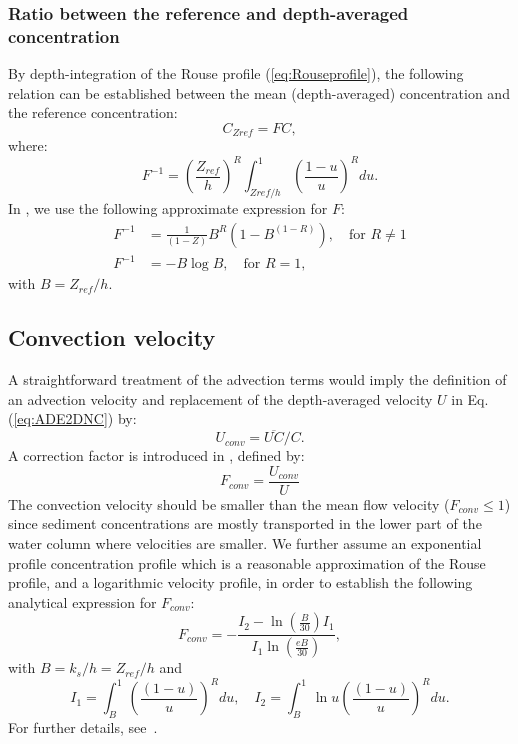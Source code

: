 \subsubsection{Ratio between the reference and depth-averaged concentration}
By depth-integration of the Rouse profile (\ref{eq:Rouseprofile}), the following relation
can be established between the mean (depth-averaged) concentration and the
reference concentration:
\begin{equation*}
C_{Zref} = F C,
\end{equation*}
where:
\begin{equation}\label{eq:Rouseprofile}
F^{-1} = \left(\frac{Z_{ref}}{h}\right)^R\int_{Zref/h}^1\left(\frac{1-u}{u}\right)^R du. 
\end{equation}
In \sisyphe, we use the following approximate expression for $F$:
\begin{align*}
F^{-1} &= \frac{1}{\left(1-Z\right)} B^R\left( 1-B^{(1-R)} \right), \quad \text{for } R \neq 1\\
F^{-1} &= -B \log B, \quad \text{for } R = 1,
\end{align*}
with $B = Z_{ref}/h$.

\subsection{Convection velocity}
A straightforward treatment of the advection terms would imply the
definition of an advection velocity and replacement of the depth-averaged
velocity $U$ in Eq. (\ref{eq:ADE2DNC}) by:
\begin{equation*}
U_{conv} = \overline{UC}/C.
\end{equation*}
A correction factor is introduced in \sisyphe, defined by:
\begin{equation*}
F_{conv} =\frac{U_{conv}}{U} 
\end{equation*}
The convection velocity should be smaller than the mean flow velocity ($F_{conv} \leq 1$) since sediment concentrations are mostly transported in the lower part of the water column where velocities are smaller. We further
assume an exponential profile concentration profile which is a reasonable
approximation of the Rouse profile, and a logarithmic velocity profile, in
order to establish the following analytical expression for $F_{conv}$:
\begin{equation*}
F_{conv} =-\frac{I_2 - \ln\left(\frac{B}{30}\right) I_1}{I_1 \ln\left( 
\frac{eB}{30}\right)}, 
\end{equation*}
with $B=k_s/h = Z_{ref}/h$ and 
\begin{equation*}
I_1 =\int_B^1\left(\frac{(1-u)}{u}\right)^R du,\quad I_2 = \int_B^1 \ln u \left(\frac{(1-u)}{u} \right)^R du.  
\end{equation*}
For further details, see~\cite{Huybrechts}.

